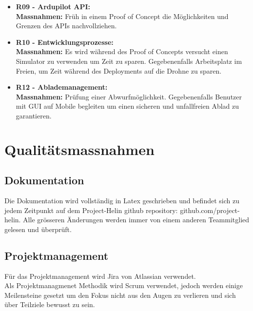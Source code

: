 \begin{itemize}
	\item{\textbf{R09 - Ardupilot API:} \\
	\textbf{Massnahmen:} Früh in einem Proof of Concept die Möglichkeiten und Grenzen des APIs nachvollziehen.}
	
	\item{\textbf{R10 - Entwicklungsprozesse:} \\
	\textbf{Massnahmen:} Es wird während des Proof of Concepts versucht einen Simulator zu verwenden um Zeit zu sparen. Gegebenenfalls Arbeitsplatz im Freien, um Zeit während des Deployments auf die Drohne zu sparen.}
	
	\item{\textbf{R12 - Ablademanagement:} \\
	\textbf{Massnahmen:} Prüfung einer Abwurfmöglichkeit. Gegebenenfalls Benutzer mit GUI auf Mobile begleiten um einen sicheren und unfallfreien Ablad zu garantieren.}
\end{itemize}

\section{Qualitätsmassnahmen}	
\subsection{Dokumentation}
Die Dokumentation wird vollständig in Latex geschrieben und befindet sich zu jedem Zeitpunkt auf dem Project-Helin github repository: github.com/project-helin. Alle grösseren Änderungen werden immer von einem anderen Teammitglied gelesen und überprüft.

\subsection{Projektmanagement}
Für das Projektmanagement wird Jira von Atlassian verwendet. \\
Als Projektmanagmenet Methodik wird Scrum verwendet, jedoch werden einige Meilensteine gesetzt um den Fokus nicht aus den Augen zu verlieren und sich über Teilziele bewusst zu sein.

